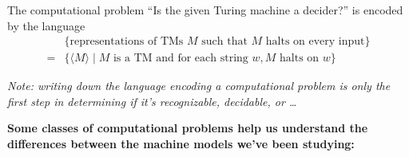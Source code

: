 \documentclass[12pt, oneside]{article}
\begin{document}
The computational problem ``Is the given Turing machine a decider?'' is encoded by the language
\begin{align*}
  &\{ \textrm{representations of TMs $M$  such that $M$ halts on every input}\}  \\
  =& \{ \langle M \rangle \mid M \textrm{ is a TM and for each string } w, \textrm{$M$ halts on $w$} \}
\end{align*}


{\it Note: writing down the language encoding a computational problem is only the first step in 
determining if it's recognizable, decidable, or \ldots }


{\bf Some classes of computational problems help us understand the differences between the machine models we've been studying:}

\vspace{-20pt}
\end{document}
